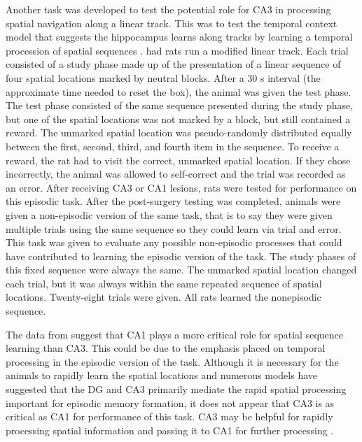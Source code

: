 \documentclass[doc, longtable]{apa6}
\begin{document}
Another task was developed to test the potential role for CA3 in processing spatial navigation along a linear track. This was to test the temporal context model that suggests the hippocampus learns along tracks by learning a temporal procession of spatial sequences \parencite{howard2005temporal}. \textcite{hunsaker2008evaluating} had rats run a modified linear track. Each trial consisted of a study phase made up of the presentation of a linear sequence of four spatial locations marked by neutral blocks. After a 30 s interval (the approximate time needed to reset the box), the animal was given the test phase. The test phase consisted of the same sequence presented during the study phase, but one of the spatial locations was not marked by a block, but still contained a reward. The unmarked spatial location was pseudo-randomly distributed equally between the first, second, third, and fourth item in the sequence. To receive a reward, the rat had to visit the correct, unmarked spatial location. If they chose incorrectly, the animal was allowed to self-correct and the trial was recorded as an error. After receiving CA3 or CA1 lesions, rats were tested for performance on this episodic task.  After the post-surgery testing was completed, animals were given a non-episodic version of the same task, that is to say they were given multiple trials using the same sequence so they could learn via trial and error. This task was given to evaluate any possible non-episodic processes that could have contributed to learning the episodic version of the task. The study phases of this fixed sequence were always the same. The unmarked spatial location changed each trial, but it was always within the same repeated sequence of spatial locations. Twenty-eight trials were given. All rats learned the nonepisodic sequence. 

The data from \textcite{hunsaker2008evaluating} suggest that CA1 plays a more critical role for spatial sequence learning than CA3. This could be due to the emphasis placed on temporal processing in the episodic version of the task. Although it is necessary for the animals to rapidly learn the spatial locations and numerous models have suggested that the DG and CA3 primarily mediate the rapid spatial processing important for episodic memory formation, it does not appear that CA3 is as critical as CA1 for performance of this task. CA3 may be helpful for rapidly processing spatial information and passing it to CA1 for further processing .
\end{document}

